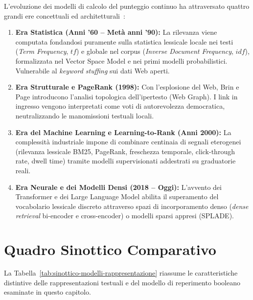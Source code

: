 L'evoluzione dei modelli di calcolo del punteggio continuo ha attraversato quattro grandi ere concettuali ed architetturali~\cite{manning2008,buttcher2010}:
\begin{enumerate}
    \item \textbf{Era Statistica (Anni '60 -- Met\`a anni '90):} La rilevanza viene computata fondandosi puramente sulla statistica lessicale locale nei testi (\textit{Term Frequency}, $tf$) e globale nel corpus (\textit{Inverse Document Frequency}, $idf$), formalizzata nel Vector Space Model e nei primi modelli probabilistici. Vulnerabile al \textit{keyword stuffing} sui dati Web aperti.
    \item \textbf{Era Strutturale e PageRank (1998):} Con l'esplosione del Web, Brin e Page introducono l'analisi topologica dell'ipertesto (Web Graph). I link in ingresso vengono interpretati come voti di autorevolezza democratica, neutralizzando le manomissioni testuali locali.
    \item \textbf{Era del Machine Learning e Learning-to-Rank (Anni 2000):} La complessit\`a industriale impone di combinare centinaia di segnali eterogenei (rilevanza lessicale BM25, PageRank, freschezza temporale, click-through rate, dwell time) tramite modelli supervisionati addestrati su graduatorie reali.
    \item \textbf{Era Neurale e dei Modelli Densi (2018 -- Oggi):} L'avvento dei Transformer e dei Large Language Model abilita il superamento del vocabolario lessicale discreto attraverso spazi di incorporamento denso (\textit{dense retrieval} bi-encoder e cross-encoder) o modelli sparsi appresi (SPLADE).
\end{enumerate}

\FloatBarrier
\section{Quadro Sinottico Comparativo}
\label{sec:quadro-sinottico-booleano}

La Tabella~\ref{tab:sinottico-modelli-rappresentazione} riassume le caratteristiche distintive delle rappresentazioni testuali e del modello di reperimento booleano esaminate in questo capitolo.

